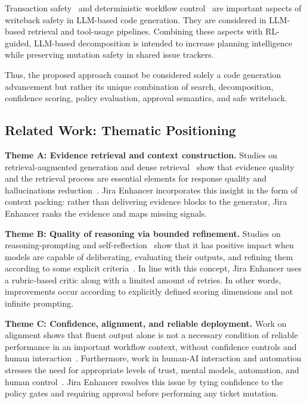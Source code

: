 \documentclass[pdflatex,sn-basic]{sn-jnl}
\begin{document}
Transaction safety~\citep{R88} and deterministic workflow control~\citep{R101} are important aspects of writeback safety in LLM-based code generation. They are considered in LLM-based retrieval and tool-usage pipelines. Combining these aspects with RL-guided, LLM-based decomposition is intended to increase planning intelligence while preserving mutation safety in shared issue trackers.

Thus, the proposed approach cannot be considered solely a code generation advancement but rather its unique combination of search, decomposition, confidence scoring, policy evaluation, approval semantics, and safe writeback.

\subsection{Related Work: Thematic Positioning}
\textbf{Theme A: Evidence retrieval and context construction.} Studies on retrieval-augmented generation and dense retrieval~\citep{R3,R32} show that evidence quality and the retrieval process are essential elements for response quality and hallucinations reduction~\citep{R22,R4,R6,R21}. Jira Enhancer incorporates this insight in the form of context packing: rather than delivering evidence blocks to the generator, Jira Enhancer ranks the evidence and maps missing signals.

\textbf{Theme B: Quality of reasoning via bounded refinement.} Studies on reasoning-prompting and self-reflection~\citep{R30,R14} show that it has positive impact when models are capable of deliberating, evaluating their outputs, and refining them according to some explicit criteria~\citep{R91,R89,R18}. In line with this concept, Jira Enhancer uses a rubric-based critic along with a limited amount of retries. In other words, improvements occur according to explicitly defined scoring dimensions and not infinite prompting.

\textbf{Theme C: Confidence, alignment, and reliable deployment.} Work on alignment shows that fluent output alone is not a necessary condition of reliable performance in an important workflow context, without confidence controls and human interaction~\citep{R90,R40,R13}. Furthermore, work in human-AI interaction and automation stresses the need for appropriate levels of trust, mental models, automation, and human control~\citep{R56,R57,R76,R75}. Jira Enhancer resolves this issue by tying confidence to the policy gates and requiring approval before performing any ticket mutation.
\end{document}
